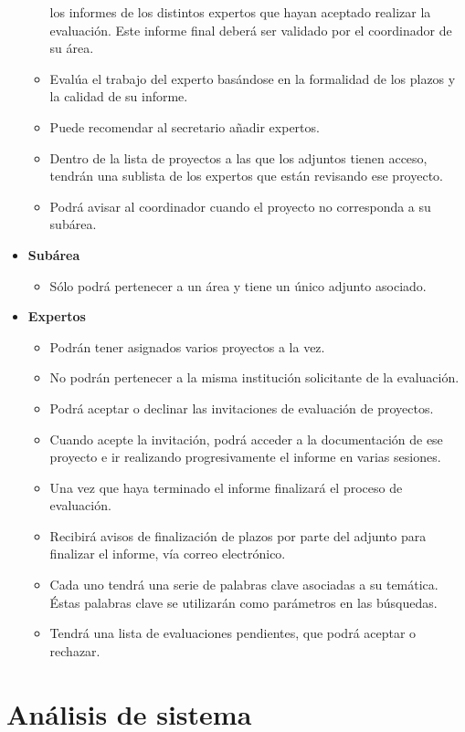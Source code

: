 \documentclass[a4paper,12pt,spanish,twoside]{article}
\begin{document}
\begin{itemize}
\begin{itemize}
los informes de los distintos expertos que hayan aceptado realizar la evaluación. Este informe final deberá ser 
validado por el coordinador de su área.
\item Evalúa el trabajo del experto basándose en la formalidad de los plazos y la calidad de su informe.
\item Puede recomendar al secretario añadir expertos.
\item Dentro de la lista de proyectos a las que los adjuntos tienen acceso, tendrán una sublista de los expertos que están revisando ese proyecto.
\item Podrá avisar al coordinador cuando el proyecto no corresponda a su subárea.
\end{itemize}
\item \textbf{Subárea}
\begin{itemize}
\item Sólo podrá pertenecer a un área y tiene un único adjunto asociado.
\end{itemize}
\item \textbf{Expertos}
\begin{itemize}
\item Podrán tener asignados varios proyectos a la vez. 
\item No podrán pertenecer a la misma institución solicitante de la evaluación.
\item Podrá aceptar o declinar las invitaciones de evaluación de proyectos.
\item Cuando acepte la invitación, podrá acceder a la documentación de ese proyecto e ir realizando progresivamente el informe en varias sesiones.
\item Una vez que haya terminado el informe finalizará el proceso de evaluación.
\item Recibirá avisos de finalización de plazos por parte del adjunto para finalizar el informe, vía correo electrónico.
\item Cada uno tendrá una serie de palabras clave asociadas a su temática. Éstas palabras clave se utilizarán como parámetros en las búsquedas.
\item Tendrá una lista de evaluaciones pendientes, que podrá aceptar o rechazar.
\end{itemize}
\end{itemize}

\section{Análisis de sistema}
\end{document}
